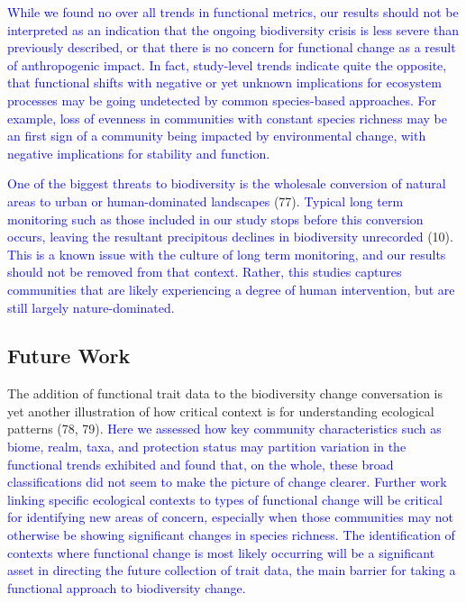 \documentclass{article}
\begin{document}
\textcolor{blue}{While we found no over all trends in functional metrics, our results should not be interpreted as an indication that the ongoing biodiversity crisis is less severe than previously described, or that there is no concern for functional change as a result of anthropogenic impact. In fact, study-level trends indicate quite the opposite, that functional shifts with negative or yet unknown implications for ecosystem processes may be going undetected by common species-based approaches. For example, loss of evenness in communities with constant species richness may be an first sign of a community being impacted by environmental change, with negative implications for stability and function.}

\textcolor{blue}{One of the biggest threats to biodiversity is the wholesale conversion of natural areas to urban or human-dominated landscapes }(77).
\textcolor{blue}{Typical long term monitoring such as those included in our study stops before this conversion occurs, leaving the resultant precipitous declines in biodiversity unrecorded}
(10).
\textcolor{blue}{This is a known issue with the culture of long term monitoring, and our results should not be removed from that context. Rather, this studies captures communities that are likely experiencing a degree of human intervention, but are still largely nature-dominated.}

\hypertarget{future-work}{%
\subsection{Future Work}\label{future-work}}

The addition of functional trait data to the biodiversity change
conversation is yet another illustration of how critical context is for
understanding ecological patterns (78, 79).
\textcolor{blue}{Here we assessed how key community characteristics such as biome, realm, taxa, and protection status may partition variation in the functional trends exhibited and found that, on the whole, these broad classifications did not seem to make the picture of change clearer. Further work linking specific ecological contexts to types of functional change will be critical for identifying new areas of concern, especially when those communities may not otherwise be showing significant changes in species richness. The identification of contexts where functional change is most likely occurring will be a significant asset in directing the future collection of trait data, the main barrier for taking a functional approach to biodiversity change.}
\end{document}
